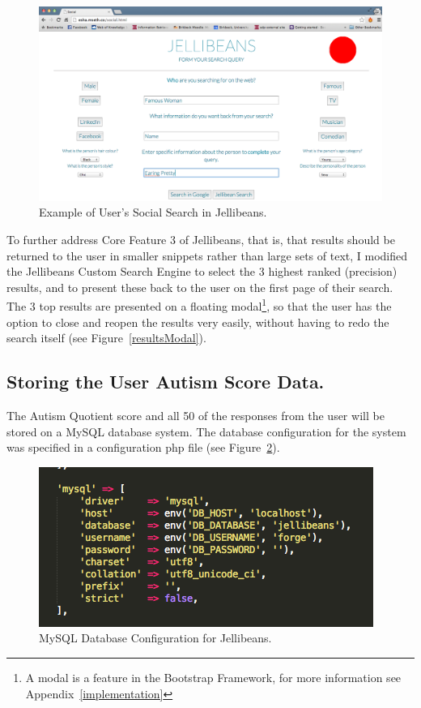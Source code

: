 \documentclass[a4paper, 11pt]{article}
\begin{document}
\begin{figure}[H]
\begin{center}
\includegraphics[scale=0.3]{SocialCompleted}
\caption{Example of User's Social Search in Jellibeans.}
\label{socialCompleted}
\end{center}
\end{figure}

\vspace{5mm} %
To further address Core Feature 3 of Jellibeans, that is, that results should be returned to the user in smaller snippets rather than large sets of text, I modified the Jellibeans Custom Search Engine to select the 3 highest ranked (precision) results, and to present these back to the user on the first page of their search. The 3 top results are presented on a floating modal\footnote{A modal is a feature in the Bootstrap Framework, for more information see Appendix~\ref{implementation}}, so that the user has the option to close and reopen the results very easily, without having to redo the search itself (see Figure~\ref{resultsModal}).

\subsection{Storing the User Autism Score Data.}

The Autism Quotient score and all 50 of the responses from the user will be stored on a MySQL database system. The database configuration for the system was specified in a configuration php file  (see Figure~\ref{dbconfig}).

\begin{figure}[H]
\begin{center}
\includegraphics[scale=0.65]{dbconfig}
\caption{MySQL Database Configuration for Jellibeans.}
\label{dbconfig}
\end{center}
\end{figure}
\end{document}
